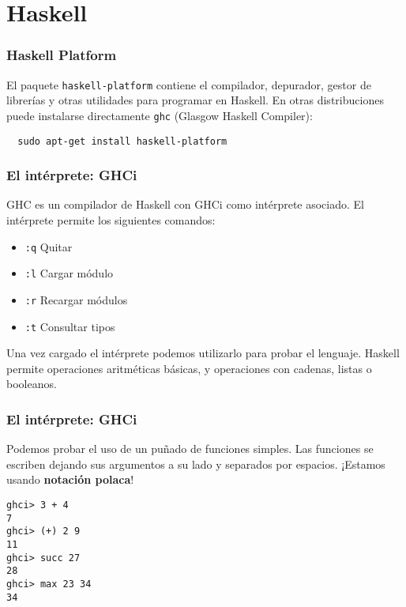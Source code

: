 \section{Haskell}
\begin{frame}[fragile]
  \frametitle{Haskell Platform}
  El paquete \texttt{haskell-platform} contiene el compilador, depurador, gestor de 
  librerías y otras utilidades para programar en Haskell.
  En otras distribuciones puede instalarse directamente \texttt{ghc} 
  (Glasgow Haskell Compiler):
  \begin{lstlisting}
  sudo apt-get install haskell-platform
  \end{lstlisting}
\end{frame}

\begin{frame}
  \frametitle{El intérprete: GHCi}
  GHC es un compilador de Haskell con GHCi como intérprete asociado. 
  El intérprete permite los siguientes comandos:
  \begin{itemize}
    \item \texttt{:q} \qquad  Quitar
    \item \texttt{:l} \qquad  Cargar módulo
    \item \texttt{:r} \qquad  Recargar módulos
    \item \texttt{:t} \qquad  Consultar tipos
  \end{itemize}
  
  Una vez cargado el intérprete podemos utilizarlo para probar el lenguaje.
  Haskell permite operaciones aritméticas básicas, y operaciones con
  cadenas, listas o booleanos.
\end{frame}

\begin{frame}[fragile]
  \frametitle{El intérprete: GHCi}
  Podemos probar el uso de un puñado de funciones simples. Las funciones
  se escriben dejando sus argumentos a su lado y separados por espacios. ¡Estamos usando
  \textbf{notación polaca}!
  
\begin{lstlisting}
ghci> 3 + 4
7
ghci> (+) 2 9
11
ghci> succ 27
28
ghci> max 23 34
34
\end{lstlisting}
\end{frame}